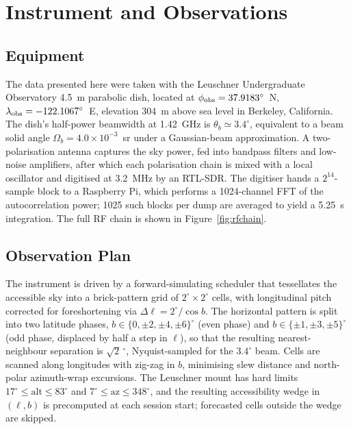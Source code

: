\documentclass[10pt,preprint2]{aastex}
\begin{document}
\section{Instrument and Observations}
\label{sec:instrument}

\subsection{Equipment}

The data presented here were taken with the Leuschner Undergraduate Observatory 4.5~m parabolic dish, located at $\phi_{\rm obs} = 37.9183^\circ$~N, $\lambda_{\rm obs} = -122.1067^\circ$~E, elevation 304~m above sea level in Berkeley, California. The dish's half-power beamwidth at 1.42~GHz is $\theta_b \simeq 3.4^\circ$, equivalent to a beam solid angle $\Omega_b = 4.0\times 10^{-3}$~sr under a Gaussian-beam approximation. A two-polarisation antenna captures the sky power, fed into bandpass filters and low-noise amplifiers, after which each polarisation chain is mixed with a local oscillator and digitised at 3.2~MHz by an RTL-SDR. The digitiser hands a $2^{14}$-sample block to a Raspberry Pi, which performs a 1024-channel FFT of the autocorrelation power; 1025 such blocks per dump are averaged to yield a 5.25~s integration. The full RF chain is shown in Figure~\ref{fig:rfchain}.

\subsection{Observation Plan}

The instrument is driven by a forward-simulating scheduler that tessellates the accessible sky into a brick-pattern grid of $2^\circ \times 2^\circ$ cells, with longitudinal pitch corrected for foreshortening via $\Delta \ell = 2^\circ / \cos b$. The horizontal pattern is split into two latitude phases, ${b\in\{0,\pm 2, \pm 4, \pm 6\}^\circ}$ (even phase) and ${b\in\{\pm 1, \pm 3, \pm 5\}^\circ}$ (odd phase, displaced by half a step in $\ell$), so that the resulting nearest-neighbour separation is $\sqrt{2}\,^\circ$, Nyquist-sampled for the $3.4^\circ$ beam. Cells are scanned along longitudes with zig-zag in $b$, minimising slew distance and north-polar azimuth-wrap excursions. The Leuschner mount has hard limits $17^\circ \le \text{alt} \le 83^\circ$ and $7^\circ \le \text{az} \le 348^\circ$, and the resulting accessibility wedge in $(\ell, b)$ is precomputed at each session start; forecasted cells outside the wedge are skipped.
\end{document}
